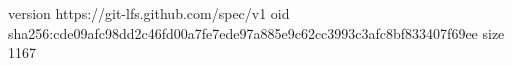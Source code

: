 version https://git-lfs.github.com/spec/v1
oid sha256:cde09afc98dd2c46fd00a7fe7ede97a885e9c62cc3993c3afc8bf833407f69ee
size 1167

